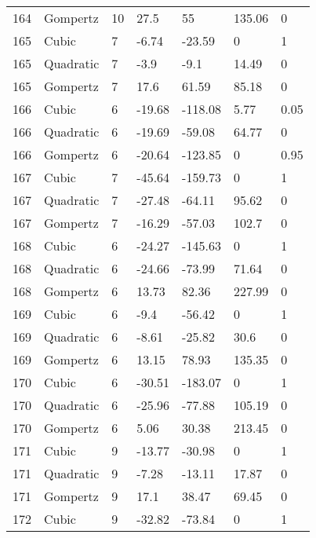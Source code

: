 \documentclass[11pt]{article}
\begin{document}
\begin{center}
\begin{longtable}{lllllll}
    164 & Gompertz  & 10              & 27.5    & 55      & 135.06  & 0    \\
    165 & Cubic     & 7               & -6.74   & -23.59  & 0       & 1    \\
    165 & Quadratic & 7               & -3.9    & -9.1    & 14.49   & 0    \\
    165 & Gompertz  & 7               & 17.6    & 61.59   & 85.18   & 0    \\
    166 & Cubic     & 6               & -19.68  & -118.08 & 5.77    & 0.05 \\
    166 & Quadratic & 6               & -19.69  & -59.08  & 64.77   & 0    \\
    166 & Gompertz  & 6               & -20.64  & -123.85 & 0       & 0.95 \\
    167 & Cubic     & 7               & -45.64  & -159.73 & 0       & 1    \\
    167 & Quadratic & 7               & -27.48  & -64.11  & 95.62   & 0    \\
    167 & Gompertz  & 7               & -16.29  & -57.03  & 102.7   & 0    \\
    168 & Cubic     & 6               & -24.27  & -145.63 & 0       & 1    \\
    168 & Quadratic & 6               & -24.66  & -73.99  & 71.64   & 0    \\
    168 & Gompertz  & 6               & 13.73   & 82.36   & 227.99  & 0    \\
    169 & Cubic     & 6               & -9.4    & -56.42  & 0       & 1    \\
    169 & Quadratic & 6               & -8.61   & -25.82  & 30.6    & 0    \\
    169 & Gompertz  & 6               & 13.15   & 78.93   & 135.35  & 0    \\
    170 & Cubic     & 6               & -30.51  & -183.07 & 0       & 1    \\
    170 & Quadratic & 6               & -25.96  & -77.88  & 105.19  & 0    \\
    170 & Gompertz  & 6               & 5.06    & 30.38   & 213.45  & 0    \\
    171 & Cubic     & 9               & -13.77  & -30.98  & 0       & 1    \\
    171 & Quadratic & 9               & -7.28   & -13.11  & 17.87   & 0    \\
    171 & Gompertz  & 9               & 17.1    & 38.47   & 69.45   & 0    \\
    172 & Cubic     & 9               & -32.82  & -73.84  & 0       & 1    \\

\end{longtable}
\end{center}
\end{document}
